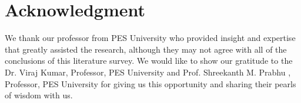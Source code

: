 \documentclass[conference]{IEEEtran}
\begin{document}
	\section*{Acknowledgment}
 We thank our professor from PES University who provided insight and expertise that greatly assisted the research, although they may not agree with all of the conclusions of this literature survey. We would like to show our gratitude to the Dr. Viraj Kumar, Professor, PES University and Prof. Shreekanth M. Prabhu , Professor, PES University for giving us this opportunity and sharing their pearls of wisdom with us.


\end{document}
